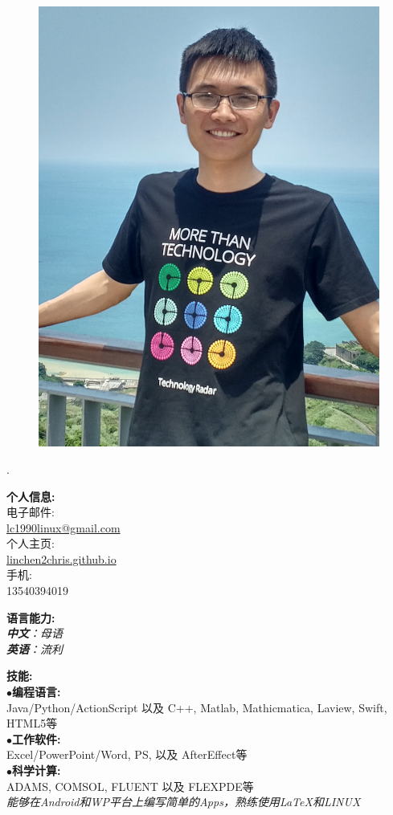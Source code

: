 \documentclass[a4paper,12pt,final]{memoir}
\newcommand{\myThemeColor}{RoyalBlue}
\newcommand{\SmallSep}{\vspace{0.9em}}
\newcommand{\CVItem}[1]
	{\textbf{\color{\myThemeColor} #1}}
\begin{document}
\begin{CJK*}{UTF8}{gbsn}%
\begin{figure}
	\hfill
	\includegraphics[width=0.8\columnwidth]{photo}
	\vspace{-7cm}
\end{figure}
\begin{flushright}\footnotesize
.\\
\vskip 6cm
    \raggedright
	\CVItem{{\large 个人信息:}}\\
	电子邮件:\\
	\href{mailto:lc1990linux@gmail.com}{lc1990linux@gmail.com}  \\
	个人主页:\\
	\href{http://linchen2chris.github.io/}{linchen2chris.github.io} \\
	手机:\\ 13540394019	
  
	\CVItem{{\large 语言能力:}}\\
	\textit{\textbf{中文}：母语 \\\textbf{英语}：流利\\}
	
	\CVItem{{\large 技能:}}\\
	$\bullet$\textbf{编程语言:}\\ Java/Python/ActionScript 以及 C++, Matlab, Mathicmatica, Laview, Swift, HTML5等\\
	$\bullet$\textbf{工作软件:}\\ Excel/PowerPoint/Word, PS, 以及 AfterEffect等 \\
	$\bullet$\textbf{科学计算:}\\ ADAMS, COMSOL, FLUENT 以及 FLEXPDE等 \\
	\SmallSep
	\textit{能够在Android和WP平台上编写简单的Apps，熟练使用\LaTeX 和LINUX}
	

\end{flushright}
\end{CJK*}
\end{document}
